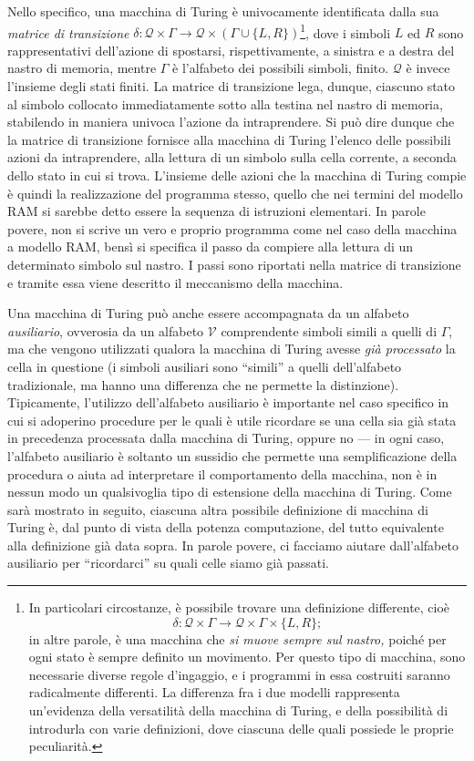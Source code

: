 \documentclass[10pt]{\classname}
\theoremstyle{newlinethm}
\theoremstyle{theorem}
\theoremstyle{definition}
\theoremstyle{definition}
\theoremstyle{definition}
\theoremstyle{definition}
\begin{document}
Nello specifico, una macchina di Turing è univocamente identificata dalla sua
\emph{matrice di transizione} $\delta  : \mathcal Q \times \Gamma \rightarrow
\mathcal Q \times (\Gamma \cup \{L,R\})$\footnote{In particolari circostanze, è
possibile trovare una definizione differente, cioè $$\delta  : \mathcal Q \times
\Gamma \rightarrow \mathcal Q \times \Gamma \times \{L,R\};$$ in altre parole, è
una macchina che \emph{si muove sempre sul nastro,} poiché per ogni stato è
sempre definito un movimento. Per questo tipo di macchina, sono necessarie
diverse regole d'ingaggio, e i programmi in essa costruiti saranno radicalmente
differenti. La differenza fra i due modelli rappresenta un'evidenza della
versatilità della macchina di Turing, e della possibilità di introdurla con
varie definizioni, dove ciascuna delle quali possiede le proprie peculiarità.},
dove i simboli $L$ ed $R$ sono rappresentativi dell'azione di spostarsi,
rispettivamente, a sinistra e a destra del nastro di memoria, mentre $\Gamma$ è
l'alfabeto dei possibili simboli, finito. $\mathcal Q$ è invece l'insieme degli
stati finiti. La matrice di transizione lega, dunque, ciascuno stato al simbolo
collocato immediatamente sotto alla testina nel nastro di memoria, stabilendo
in maniera univoca l'azione da intraprendere. Si può dire dunque che la matrice
di transizione fornisce alla macchina di Turing l'elenco delle possibili azioni
da intraprendere, alla lettura di un simbolo sulla cella corrente, a seconda
dello stato in cui si trova. L'insieme delle azioni che la macchina di Turing
compie è quindi la realizzazione del programma stesso, quello che nei termini
del modello RAM si sarebbe detto essere la sequenza di istruzioni elementari.
In parole povere, non si scrive un vero e proprio programma come nel caso della
macchina a modello RAM, bensì si specifica il passo da compiere alla lettura di
un determinato simbolo sul nastro. I passi sono riportati nella matrice di
transizione e tramite essa viene descritto il meccanismo della macchina.

Una macchina di Turing può anche essere accompagnata da un alfabeto
\emph{ausiliario}, ovverosia da un alfabeto $\mathcal V$ comprendente simboli
simili a quelli di $\Gamma$, ma che vengono utilizzati qualora la macchina di
Turing avesse \emph{già processato} la cella in questione (i simboli ausiliari
sono ``simili'' a quelli dell'alfabeto tradizionale, ma hanno una differenza
che ne permette la distinzione). Tipicamente, l'utilizzo dell'alfabeto
ausiliario è importante nel caso specifico in cui si adoperino procedure per le
quali è utile ricordare se una cella sia già stata in precedenza processata
dalla macchina di Turing, oppure no --- in ogni caso, l'alfabeto ausiliario è
soltanto un sussidio che permette una semplificazione della procedura o aiuta
ad interpretare il comportamento della macchina, non è in nessun modo un
qualsivoglia tipo di estensione della macchina di Turing. Come sarà mostrato in
seguito, ciascuna altra possibile definizione di macchina di Turing è, dal
punto di vista della potenza computazione, del tutto equivalente alla
definizione già data sopra. In parole povere, ci facciamo aiutare dall'alfabeto
ausiliario per ``ricordarci'' su quali celle siamo già passati.
\end{document}
